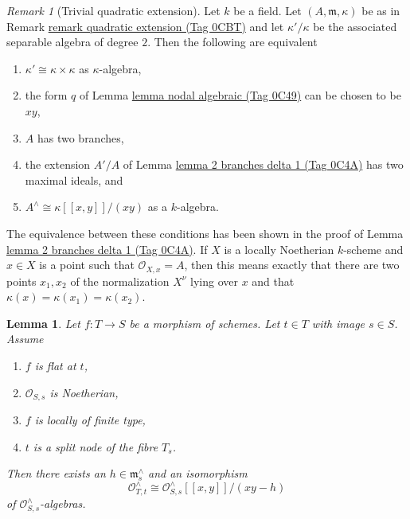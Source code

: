 \documentclass{amsart}
\theoremstyle{plain}
\newtheorem{lemma}[subsection]{Lemma}
\theoremstyle{definition}
\theoremstyle{remark}
\newtheorem{remark}[subsection]{Remark}
\numberwithin{equation}{subsection}
\begin{document}
\begin{remark}[Trivial quadratic extension]
\label{remark-trivial-quadratic-extension}
Let $k$ be a field. Let $(A, \mathfrak m, \kappa)$ be as in
Remark \href{https://stacks.math.columbia.edu/tag/0CBT}{remark quadratic extension (Tag 0CBT)} and let $\kappa'/\kappa$
be the associated separable algebra of degree $2$.
Then the following are equivalent
\begin{enumerate}
\item $\kappa' \cong \kappa \times \kappa$ as $\kappa$-algebra,
\item the form $q$ of Lemma \href{https://stacks.math.columbia.edu/tag/0C49}{lemma nodal algebraic (Tag 0C49)}
can be chosen to be $xy$,
\item $A$ has two branches,
\item the extension $A'/A$ of Lemma \href{https://stacks.math.columbia.edu/tag/0C4A}{lemma 2 branches delta 1 (Tag 0C4A)}
has two maximal ideals, and
\item $A^\wedge \cong \kappa[[x, y]]/(xy)$ as a $k$-algebra.
\end{enumerate}
The equivalence between these conditions has been shown in the
proof of Lemma \href{https://stacks.math.columbia.edu/tag/0C4A}{lemma 2 branches delta 1 (Tag 0C4A)}. If $X$ is a
locally Noetherian $k$-scheme and $x \in X$ is a point such that
$\mathcal{O}_{X, x} = A$, then this means exactly that
there are two points $x_1, x_2$ of the normalization $X^\nu$
lying over $x$ and that $\kappa(x) = \kappa(x_1) = \kappa(x_2)$.
\end{remark}

\begin{lemma}
\label{lemma-formal-local-structure-nodal-family}
Let $f : T \to S$ be a morphism of schemes. Let $t \in T$
with image $s \in S$. Assume
\begin{enumerate}
\item $f$ is flat at $t$,
\item $\mathcal{O}_{S, s}$ is Noetherian,
\item $f$ is locally of finite type,
\item $t$ is a split node of the fibre $T_s$.
\end{enumerate}
Then there exists an $h \in \mathfrak m_s^\wedge$ and an isomorphism
$$
\mathcal{O}_{T, t}^\wedge \cong
\mathcal{O}_{S, s}^\wedge[[x, y]]/(xy - h)
$$
of $\mathcal{O}_{S, s}^\wedge$-algebras.
\end{lemma}
\end{document}
